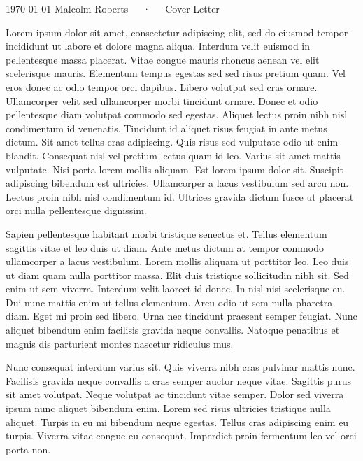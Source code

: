 \documentclass[11pt, a4paper]{awesome-cv}
\begin{document}
\makecvheader

\makecvfooter
{\today}
{Malcolm Roberts~~~·~~~Cover Letter}
{}

\makelettertitle

\begin{cvletter}

    Lorem ipsum dolor sit amet, consectetur adipiscing elit, sed do eiusmod tempor incididunt ut labore et dolore magna aliqua. Interdum velit euismod in pellentesque massa placerat. Vitae congue mauris rhoncus aenean vel elit scelerisque mauris. Elementum tempus egestas sed sed risus pretium quam. Vel eros donec ac odio tempor orci dapibus. Libero volutpat sed cras ornare. Ullamcorper velit sed ullamcorper morbi tincidunt ornare. Donec et odio pellentesque diam volutpat commodo sed egestas. Aliquet lectus proin nibh nisl condimentum id venenatis. Tincidunt id aliquet risus feugiat in ante metus dictum. Sit amet tellus cras adipiscing. Quis risus sed vulputate odio ut enim blandit. Consequat nisl vel pretium lectus quam id leo. Varius sit amet mattis vulputate. Nisi porta lorem mollis aliquam. Est lorem ipsum dolor sit. Suscipit adipiscing bibendum est ultricies. Ullamcorper a lacus vestibulum sed arcu non. Lectus proin nibh nisl condimentum id. Ultrices gravida dictum fusce ut placerat orci nulla pellentesque dignissim.

    Sapien pellentesque habitant morbi tristique senectus et. Tellus elementum sagittis vitae et leo duis ut diam. Ante metus dictum at tempor commodo ullamcorper a lacus vestibulum. Lorem mollis aliquam ut porttitor leo. Leo duis ut diam quam nulla porttitor massa. Elit duis tristique sollicitudin nibh sit. Sed enim ut sem viverra. Interdum velit laoreet id donec. In nisl nisi scelerisque eu. Dui nunc mattis enim ut tellus elementum. Arcu odio ut sem nulla pharetra diam. Eget mi proin sed libero. Urna nec tincidunt praesent semper feugiat. Nunc aliquet bibendum enim facilisis gravida neque convallis. Natoque penatibus et magnis dis parturient montes nascetur ridiculus mus.

    Nunc consequat interdum varius sit. Quis viverra nibh cras pulvinar mattis nunc. Facilisis gravida neque convallis a cras semper auctor neque vitae. Sagittis purus sit amet volutpat. Neque volutpat ac tincidunt vitae semper. Dolor sed viverra ipsum nunc aliquet bibendum enim. Lorem sed risus ultricies tristique nulla aliquet. Turpis in eu mi bibendum neque egestas. Tellus cras adipiscing enim eu turpis. Viverra vitae congue eu consequat. Imperdiet proin fermentum leo vel orci porta non.

\end{cvletter}


\makeletterclosing
\end{document}
